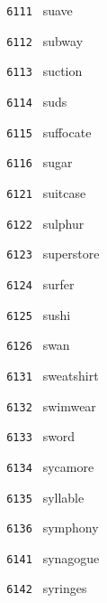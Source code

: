 \documentclass[11pt]{article}
\begin{document}
\begin{multicols}{6}
\small
\noindent \texttt{ 6111 } \hspace{1mm} suave  \par
\noindent \texttt{ 6112 } \hspace{1mm} subway  \par
\noindent \texttt{ 6113 } \hspace{1mm} suction  \par
\noindent \texttt{ 6114 } \hspace{1mm} suds  \par
\noindent \texttt{ 6115 } \hspace{1mm} suffocate  \par
\noindent \texttt{ 6116 } \hspace{1mm} sugar  \par
\noindent \texttt{ 6121 } \hspace{1mm} suitcase  \par
\noindent \texttt{ 6122 } \hspace{1mm} sulphur  \par
\noindent \texttt{ 6123 } \hspace{1mm} superstore  \par
\noindent \texttt{ 6124 } \hspace{1mm} surfer  \par
\noindent \texttt{ 6125 } \hspace{1mm} sushi  \par
\noindent \texttt{ 6126 } \hspace{1mm} swan  \par
\noindent \texttt{ 6131 } \hspace{1mm} sweatshirt  \par
\noindent \texttt{ 6132 } \hspace{1mm} swimwear  \par
\noindent \texttt{ 6133 } \hspace{1mm} sword  \par
\noindent \texttt{ 6134 } \hspace{1mm} sycamore  \par
\noindent \texttt{ 6135 } \hspace{1mm} syllable  \par
\noindent \texttt{ 6136 } \hspace{1mm} symphony  \par
\noindent \texttt{ 6141 } \hspace{1mm} synagogue  \par
\noindent \texttt{ 6142 } \hspace{1mm} syringes  \par

\end{multicols}
\end{document}
